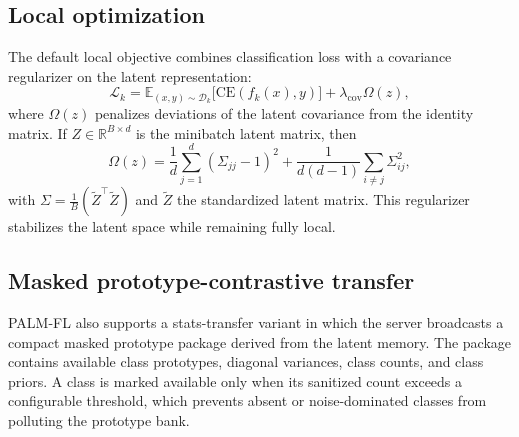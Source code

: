 \documentclass[10pt,journal]{IEEEtran}
\newcommand{\statstransfer}{stats-transfer}
\newcommand{\R}{\mathbb{R}}
\newcommand{\E}{\mathbb{E}}
\begin{document}
\subsection{Local optimization}
The default local objective combines classification loss with a covariance regularizer on the latent representation:
\begin{equation}
\mathcal{L}_k = \E_{(x,y)\sim\mathcal{D}_k}\big[\mathrm{CE}(f_k(x),y)\big]
+ \lambda_{\mathrm{cov}}\Omega(z),
\label{eq:local_loss}
\end{equation}
where $\Omega(z)$ penalizes deviations of the latent covariance from the identity matrix. If $Z\in\R^{B\times d}$ is the minibatch latent matrix, then
\begin{equation}
\Omega(z)=
\frac{1}{d}\sum_{j=1}^{d}(\Sigma_{jj}-1)^2
+\frac{1}{d(d-1)}\sum_{i\neq j}\Sigma_{ij}^2,
\end{equation}
with $\Sigma=\frac{1}{B}(\widetilde{Z}^{\top}\widetilde{Z})$ and $\widetilde{Z}$ the standardized latent matrix. This regularizer stabilizes the latent space while remaining fully local.

\subsection{Masked prototype-contrastive transfer}
PALM-FL also supports a \statstransfer{} variant in which the server broadcasts a compact masked prototype package derived from the latent memory. The package contains available class prototypes, diagonal variances, class counts, and class priors. A class is marked available only when its sanitized count exceeds a configurable threshold, which prevents absent or noise-dominated classes from polluting the prototype bank.
\end{document}
